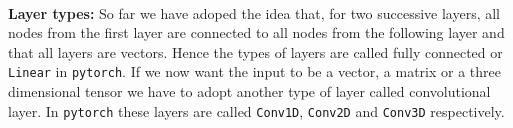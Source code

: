 \\
\textbf{Layer types:} So far we have adoped the idea that, for two successive layers, all nodes from the first layer are connected to all nodes from the following layer and that all layers are vectors. Hence the types of layers are called fully connected or \texttt{Linear} in \texttt{pytorch}\cite{torch_ini}. If we now want the input to be a vector, a matrix or a three dimensional tensor we have to adopt another type of layer called convolutional layer. In \texttt{pytorch} these layers are called \texttt{Conv1D}, \texttt{Conv2D} and \texttt{Conv3D} respectively.  
